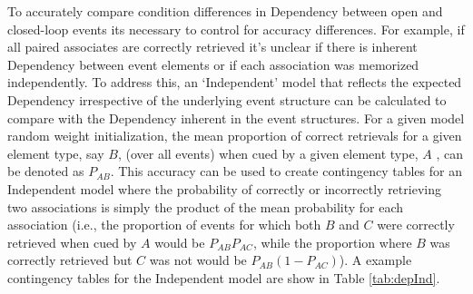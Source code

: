 \documentclass[11pt, titlepage, twoside]{article}
\begin{document}
To accurately compare condition differences in Dependency between open and closed-loop events its necessary to control for accuracy differences.  For example, if all paired associates are correctly retrieved it's unclear if there is inherent Dependency between event elements or if each association was memorized independently.   To address this, an `Independent' model that reflects the expected Dependency irrespective of the underlying event structure can be calculated to compare with the Dependency inherent in the event structures. For a given model random weight initialization, the mean proportion of correct retrievals for a given element type, say $B$, (over all events) when cued by a given element type, $A$ , can be denoted as $P_{AB}$. This accuracy can be used to create contingency tables for an Independent model where the probability of correctly or incorrectly retrieving two associations is simply the product of the mean probability for each association (i.e., the proportion of events for which both $B$ and $C$ were correctly retrieved when cued by $A$ would be $P_{AB}  P_{AC}$, while the proportion where $B$ was correctly retrieved but $C$ was not would be $P_{AB}(1-P_{AC})$).  A example contingency tables for the Independent model are show in Table \ref{tab:depInd}.
\end{document}
